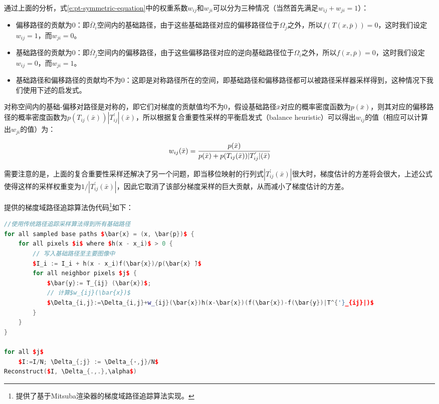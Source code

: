 通过上面的分析，式\ref{e:pt-symmetric-equation}中的权重系数$w_{ij}$和$w_{ji}$可以分为三种情况（当然首先满足$w_{ij}+w_{ji}=1$）：

\begin{itemize}
	\item 偏移路径的贡献为0：即$\bar{\Omega}_i$空间内的基础路径，由于这些基础路径对应的偏移路径位于$\Omega_j$之外，所以$f(T(x,\bar{p}))=0$，这时我们设定$w_{ij}=1$，而$w_{ji}=0$。
	\item 基础路径的贡献为0：即$\bar{\Omega}_j$空间内的偏移路径，由于这些偏移路径对应的逆向基础路径位于$\Omega_i$之外，所以$f(x,\bar{p})=0$，这时我们设定$w_{ij}=0$，而$w_{ji}=1$。
	\item 基础路径和偏移路径的贡献均不为0：这即是对称路径所在的空间，即基础路径和偏移路径都可以被路径采样器采样得到，这种情况下我们使用下述的启发式。
\end{itemize}

对称空间内的基础-偏移对路径是对称的，即它们对梯度的贡献值均不为0，假设基础路径$\bar{x}$对应的概率密度函数为$p(\bar{x})$，则其对应的偏移路径的概率密度函数为$p(T_{ij}(\bar{x}))|T^{'}_{ij}|(\bar{x})$，所以根据复合重要性采样的平衡启发式（balance heuristic）可以得出$w_{ij}$的值（相应可以计算出$w_{ji}$的值）为：

\begin{equation}
	w_{ij}(\bar{x})= \cfrac{p(\bar{x})}{p(\bar{x})+p(T_{ij}(\bar{x}))|T^{'}_{ij}|(\bar{x})}
\end{equation}

需要注意的是，上面的复合重要性采样还解决了另一个问题，即当移位映射的行列式$|T^{'}_{ij}(\bar{x})|$很大时，梯度估计的方差将会很大，上述公式使得这样的采样权重变为$1/|T^{'}_{ij}(\bar{x})|$，因此它取消了该部分梯度采样的巨大贡献，从而减小了梯度估计的方差。

\cite{a:GradientDomainPathTracing}提供的梯度域路径追踪算法伪代码\footnote{\cite{a:GradientdomainpathtracingGPTandgradientdomainbidirectionalpathtracingGBDPTforMitsubarenderer}提供了基于Mitsuba渲染器的梯度域路径追踪算法实现。}如下：

\begin{lstlisting}[language=C++,mathescape]
//使用传统路径追踪采样算法得到所有基础路径
for all sampled base paths $\bar{x} = (x, \bar{p})$ {
	for all pixels $i$ where $h(x - x_i)$ > 0 {
		// 写入基础路径至主要图像中
		$I_i := I_i + h(x - x_i)f(\bar{x})/p(\bar{x} ̄)$
		for all neighbor pixels $j$ {
			$\bar{y}:= T_{ij} (\bar{x})$; 
			// 计算$w_{ij}(\bar{x})$
			$\Delta_{i,j}:=\Delta_{i,j}+w_{ij}(\bar{x})h(x-\bar{x})(f(\bar{x})-f(\bar{y})|T^{'}_{ij}|)$
		}
	}
}
	
for all $j$ 
	$I:=I/N; \Delta_{;j} := \Delta_{·,j}/N$
Reconstruct($I, \Delta_{.,.},\alpha$)
\end{lstlisting}

